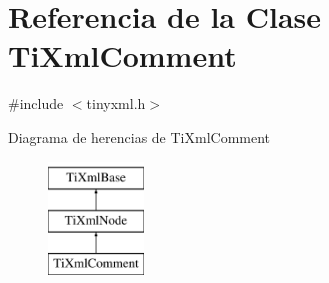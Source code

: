\hypertarget{classTiXmlComment}{\section{\-Referencia de la \-Clase \-Ti\-Xml\-Comment}
\label{classTiXmlComment}
}


{\ttfamily \#include $<$tinyxml.\-h$>$}

\-Diagrama de herencias de \-Ti\-Xml\-Comment\begin{figure}[H]
\begin{center}
\leavevmode
\includegraphics[height=3.000000cm]{classTiXmlComment}
\end{center}
\end{figure}
